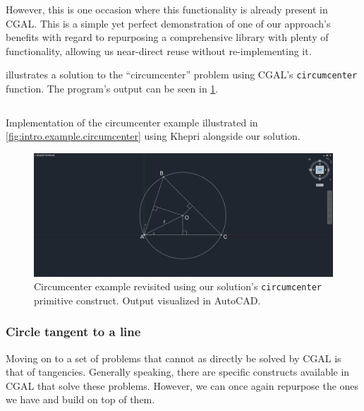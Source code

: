 However, this is one occasion where this functionality is already present in
\ac{CGAL}.  This is a simple yet perfect demonstration of one of our approach's
benefits with regard to repurposing a comprehensive library with plenty of
functionality, allowing us near-direct reuse without re-implementing it.

 illustrates a solution to the
``circumcenter'' problem using \ac{CGAL}'s \texttt{circumcenter} function.  The
program's output can be seen in \cref{fig:solution.impl.gcps.circumcenter}.

\begin{listing}[htbp]
  \inputminted{julia}{jl/ex_circumcenter.jl}
  \caption[Circumcenter example using our solution]{
    Implementation of the circumcenter example illustrated in
    \cref{fig:intro.example.circumcenter} using Khepri alongside our solution.}%
  \label{lst:solution.impl.gcps.circumcenter}
\end{listing}

\begin{figure}[htbp]
  \includegraphics[width=\linewidth]{fig/autocad-circumcenter} 
  \caption[Circumcenter example using our solution]{
    Circumcenter example revisited using our solution's \texttt{circumcenter}
    primitive construct.  Output visualized in AutoCAD.}%
    \label{fig:solution.impl.gcps.circumcenter}
\end{figure}

\subsubsection{Circle tangent to a line}%
\label{sec:solution.impl.gcps.tangcirc2line}

Moving on to a set of problems that cannot as directly be solved by \ac{CGAL} is
that of tangencies.  Generally speaking, there are specific constructs available
in \ac{CGAL} that solve these problems.  However, we can once again repurpose
the ones we have and build on top of them.

